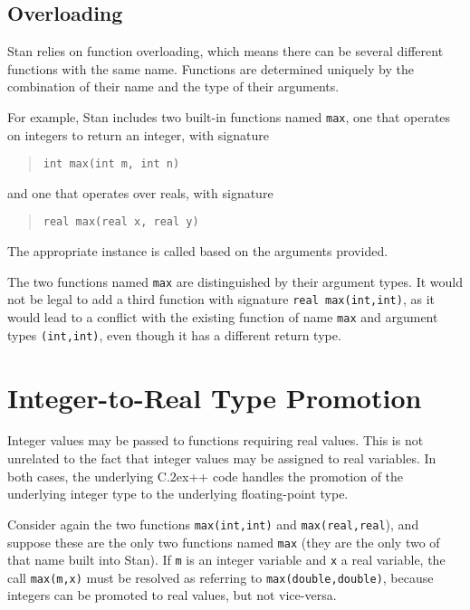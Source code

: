 \documentclass[10pt]{report}
\newcommand{\Stan}{Stan\xspace}
\newcommand*{\Cpp}{C\raise.2ex\hbox{\footnotesize ++}\xspace} %
\newcommand{\code}[1]{{\tt #1}}
\begin{document}
\subsection{Overloading}

\Stan relies on function overloading, which means there can be several
different functions with the same name.  Functions are determined
uniquely by the combination of their name and the type of their
arguments.

For example, \Stan includes two built-in functions named \code{max}, one that
operates on integers to return an integer, with signature
%
\begin{quote}
\begin{Verbatim}
int max(int m, int n)
\end{Verbatim}
\end{quote}
%
and one that operates over reals, with signature
%
\begin{quote}
\begin{Verbatim}
real max(real x, real y)
\end{Verbatim}
\end{quote}
%
The appropriate instance is called based on the arguments provided.

The two functions named \code{max} are distinguished by their argument
types.  It would not be legal to add a third function with signature
\code{real max(int,int)}, as it would lead to a conflict with the
existing function of name \code{max} and argument types
\code{(int,int)}, even though it has a different return type.


\section{Integer-to-Real Type Promotion}

Integer values may be passed to functions requiring real values.  This
is not unrelated to the fact that integer values may be assigned to
real variables.  In both cases, the underlying \Cpp code handles the
promotion of the underlying integer type to the underlying
floating-point type.

Consider again the two functions \code{max(int,int)} and
\code{max(real,real}), and suppose these are the only two functions
named \code{max} (they are the only two of that name built into
\Stan).  If \code{m} is an integer variable and \code{x} a real
variable, the call \code{max(m,x)} must be resolved as referring to
\code{max(double,double)}, because integers can be promoted to real
values, but not vice-versa.  
\end{document}
